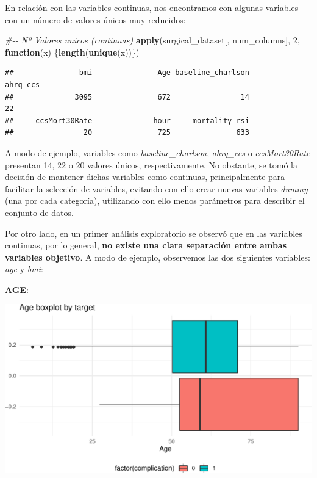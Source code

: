 \documentclass[
]{article}
\newenvironment{Shaded}{\begin{snugshade}}{\end{snugshade}}
\newcommand{\CommentTok}[1]{\textcolor[rgb]{0.56,0.35,0.01}{\textit{#1}}}
\newcommand{\ControlFlowTok}[1]{\textcolor[rgb]{0.13,0.29,0.53}{\textbf{#1}}}
\newcommand{\DecValTok}[1]{\textcolor[rgb]{0.00,0.00,0.81}{#1}}
\newcommand{\KeywordTok}[1]{\textcolor[rgb]{0.13,0.29,0.53}{\textbf{#1}}}
\newcommand{\NormalTok}[1]{#1}
\begin{document}
En relación con las variables continuas, nos encontramos con algunas
variables con un número de valores únicos muy reducidos:

\begin{Shaded}
\begin{Highlighting}[]
\CommentTok{\#{-}{-} Nº Valores unicos (continuas)}
\KeywordTok{apply}\NormalTok{(surgical\_dataset[, num\_columns], }\DecValTok{2}\NormalTok{, }\ControlFlowTok{function}\NormalTok{(x) \{}\KeywordTok{length}\NormalTok{(}\KeywordTok{unique}\NormalTok{(x))\})}
\end{Highlighting}
\end{Shaded}

\begin{verbatim}
##               bmi               Age baseline_charlson          ahrq_ccs 
##              3095               672                14                22 
##     ccsMort30Rate              hour     mortality_rsi 
##                20               725               633
\end{verbatim}

A modo de ejemplo, variables como \emph{baseline\_charlson},
\emph{ahrq\_ccs} o \emph{ccsMort30Rate} presentan 14, 22 o 20 valores
únicos, respectivamente. No obstante, se tomó la decisión de mantener
dichas variables como continuas, principalmente para facilitar la
selección de variables, evitando con ello crear nuevas variables
\emph{dummy} (una por cada categoría), utilizando con ello menos
parámetros para describir el conjunto de datos.

Por otro lado, en un primer análisis exploratorio se observó que en las
variables continuas, por lo general, \textbf{no existe una clara
separación entre ambas variables objetivo}. A modo de ejemplo,
observemos las dos siguientes variables: \emph{age} y \emph{bmi}:

\textbf{AGE}:

\includegraphics{memoria_files/figure-latex/unnamed-chunk-21-1}
\end{document}
